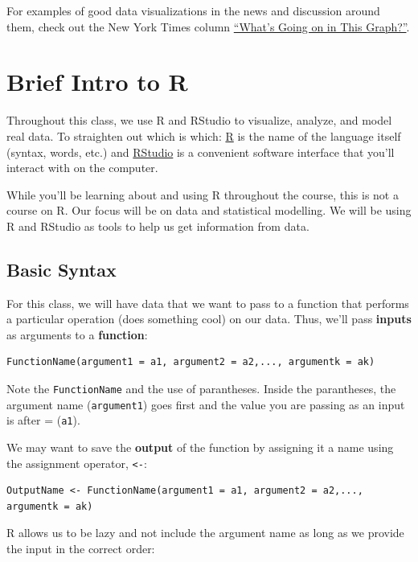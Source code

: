 \documentclass[
]{book}
\begin{document}
For examples of good data visualizations in the news and discussion around them, check out the New York Times column \href{https://www.nytimes.com/column/whats-going-on-in-this-graph}{``What's Going on in This Graph?''}.

\hypertarget{brief-intro-to-r}{%
\section{Brief Intro to R}\label{brief-intro-to-r}}

Throughout this class, we use R and RStudio to visualize, analyze, and model real data. To straighten out which is which: \href{https://cran.r-project.org/}{R} is the name of the language itself (syntax, words, etc.) and \href{https://www.rstudio.com/}{RStudio} is a convenient software interface that you'll interact with on the computer.

While you'll be learning about and using R throughout the course, this is not a course on R. Our focus will be on data and statistical modelling. We will be using R and RStudio as tools to help us get information from data.

\hypertarget{basic-syntax}{%
\subsection{Basic Syntax}\label{basic-syntax}}

For this class, we will have data that we want to pass to a function that performs a particular operation (does something cool) on our data. Thus, we'll pass \textbf{inputs} as arguments to a \textbf{function}:

\begin{verbatim}
FunctionName(argument1 = a1, argument2 = a2,..., argumentk = ak)
\end{verbatim}

Note the \texttt{FunctionName} and the use of parantheses. Inside the parantheses, the argument name (\texttt{argument1}) goes first and the value you are passing as an input is after = (\texttt{a1}).

We may want to save the \textbf{output} of the function by assigning it a name using the assignment operator, \texttt{\textless{}-}:

\begin{verbatim}
OutputName <- FunctionName(argument1 = a1, argument2 = a2,..., argumentk = ak)
\end{verbatim}

R allows us to be lazy and not include the argument name as long as we provide the input in the correct order:
\end{document}
